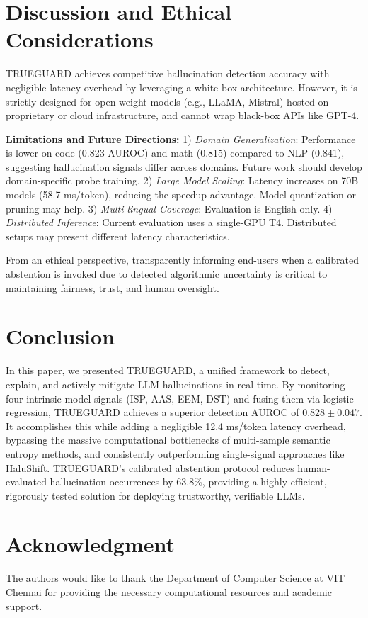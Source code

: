 \documentclass[conference]{IEEEtran}
\begin{document}
\section{Discussion and Ethical Considerations}
TRUEGUARD achieves competitive hallucination detection accuracy with negligible latency overhead by leveraging a white-box architecture. However, it is strictly designed for open-weight models (e.g., LLaMA, Mistral) hosted on proprietary or cloud infrastructure, and cannot wrap black-box APIs like GPT-4.

\textbf{Limitations and Future Directions:} 
1) \textit{Domain Generalization}: Performance is lower on code (0.823 AUROC) and math (0.815) compared to NLP (0.841), suggesting hallucination signals differ across domains. Future work should develop domain-specific probe training.
2) \textit{Large Model Scaling}: Latency increases on 70B models (58.7 ms/token), reducing the speedup advantage. Model quantization or pruning may help.
3) \textit{Multi-lingual Coverage}: Evaluation is English-only.
4) \textit{Distributed Inference}: Current evaluation uses a single-GPU T4. Distributed setups may present different latency characteristics.

From an ethical perspective, transparently informing end-users when a calibrated abstention is invoked due to detected algorithmic uncertainty is critical to maintaining fairness, trust, and human oversight. 

\section{Conclusion}
In this paper, we presented TRUEGUARD, a unified framework to detect, explain, and actively mitigate LLM hallucinations in real-time. By monitoring four intrinsic model signals (ISP, AAS, EEM, DST) and fusing them via logistic regression, TRUEGUARD achieves a superior detection AUROC of $0.828 \pm 0.047$. It accomplishes this while adding a negligible 12.4 ms/token latency overhead, bypassing the massive computational bottlenecks of multi-sample semantic entropy methods, and consistently outperforming single-signal approaches like HaluShift. TRUEGUARD's calibrated abstention protocol reduces human-evaluated hallucination occurrences by 63.8\%, providing a highly efficient, rigorously tested solution for deploying trustworthy, verifiable LLMs.

\section*{Acknowledgment}
The authors would like to thank the Department of Computer Science at VIT Chennai for providing the necessary computational resources and academic support.

\nocite{*}


\end{document}
